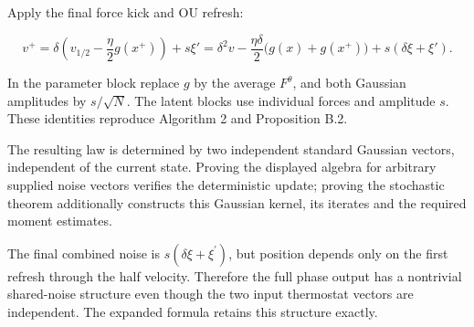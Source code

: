 \documentclass[11pt,a4paper]{article}
\begin{document}
Apply the final force kick and OU refresh:


\[v^+=\delta\left(v_{1/2}-\frac\eta2g(x^+)\right)+s\xi'
=\delta^2v-\frac{\eta\delta}2\bigl(g(x)+g(x^+)\bigr)
+s(\delta\xi+\xi').\]


In the parameter block replace \(g\) by the average \(F^\theta\), and
both Gaussian amplitudes by \(s/\sqrt N\). The latent blocks use individual
forces and amplitude \(s\). These identities reproduce Algorithm 2 and
Proposition B.2.




The resulting law is determined by two independent standard Gaussian
vectors, independent of the current state. Proving the displayed algebra for
arbitrary supplied noise vectors verifies the deterministic update;
proving the stochastic theorem additionally constructs this Gaussian kernel,
its iterates and the required moment estimates.



The final combined noise is \(s(\delta\xi+\xi^{\prime})\), but position depends only on the first refresh through the half velocity. Therefore the full phase output has a nontrivial shared-noise structure even though the two input thermostat vectors are independent. The expanded formula retains this structure exactly.
\end{document}
